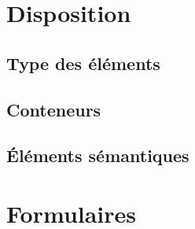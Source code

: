 \documentclass[xcolor=table]{beamer}
\begin{document}
\section{Disposition}

\subsection{Type des éléments}


\subsection{Conteneurs}



\subsection{Éléments sémantiques}


\section{Formulaires}
\end{document}

